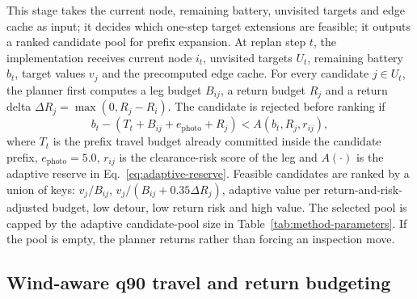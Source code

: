 \documentclass[preprint,12pt]{elsarticle}
\begin{document}
This stage takes the current node, remaining battery, unvisited targets and edge cache as input; it decides which one-step target extensions are feasible; it outputs a ranked candidate pool for prefix expansion. At replan step $t$, the implementation receives current node $i_t$, unvisited targets $U_t$, remaining battery $b_t$, target values $v_j$ and the precomputed edge cache. For every candidate $j\in U_t$, the planner first computes a leg budget $B_{ij}$, a return budget $R_j$ and a return delta $\Delta R_j=\max(0,R_j-R_i)$. The candidate is rejected before ranking if
\begin{equation}
    b_t - \left(T_t + B_{ij} + e_{\mathrm{photo}} + R_j\right) < A(b_t,R_j,r_{ij}),
    \label{eq:single-feasibility}
\end{equation}
where $T_t$ is the prefix travel budget already committed inside the candidate prefix, $e_{\mathrm{photo}}=5.0$, $r_{ij}$ is the clearance-risk score of the leg and $A(\cdot)$ is the adaptive reserve in Eq.~\eqref{eq:adaptive-reserve}. Feasible candidates are ranked by a union of keys: $v_j/B_{ij}$, $v_j/(B_{ij}+0.35\Delta R_j)$, adaptive value per return-and-risk-adjusted budget, low detour, low return risk and high value. The selected pool is capped by the adaptive candidate-pool size in Table~\ref{tab:method-parameters}. If the pool is empty, the planner returns rather than forcing an inspection move.

\subsection{Wind-aware q90 travel and return budgeting}
\end{document}
